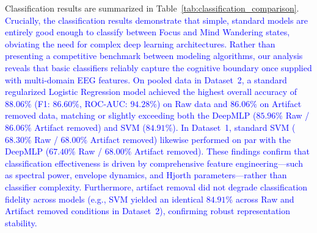 \documentclass[conference]{IEEEtran}
\begin{document}
Classification results are summarized in Table~\ref{tab:classification_comparison}. \textcolor{blue}{Crucially, the classification results demonstrate that simple, standard models are entirely good enough to classify between Focus and Mind Wandering states, obviating the need for complex deep learning architectures. Rather than presenting a competitive benchmark between modeling algorithms, our analysis reveals that basic classifiers reliably capture the cognitive boundary once supplied with multi-domain EEG features. On pooled data in Dataset~2, a standard regularized Logistic Regression model achieved the highest overall accuracy of $88.06\%$ (F1: $86.60\%$, ROC-AUC: $94.28\%$) on Raw data and $86.06\%$ on Artifact removed data, matching or slightly exceeding both the DeepMLP ($85.96\%$ Raw / $86.06\%$ Artifact removed) and SVM ($84.91\%$). In Dataset~1, standard SVM ($68.30\%$ Raw / $68.00\%$ Artifact removed) likewise performed on par with the DeepMLP ($67.40\%$ Raw / $68.00\%$ Artifact removed). These findings confirm that classification effectiveness is driven by comprehensive feature engineering—such as spectral power, envelope dynamics, and Hjorth parameters—rather than classifier complexity. Furthermore, artifact removal did not degrade classification fidelity across models (e.g., SVM yielded an identical $84.91\%$ across Raw and Artifact removed conditions in Dataset~2), confirming robust representation stability.}

\begin{table}[h]
\centering
\caption{Classification performance on Dataset~1 and Dataset~2.}
\label{tab:classification_comparison}
\end{table}
\end{document}
